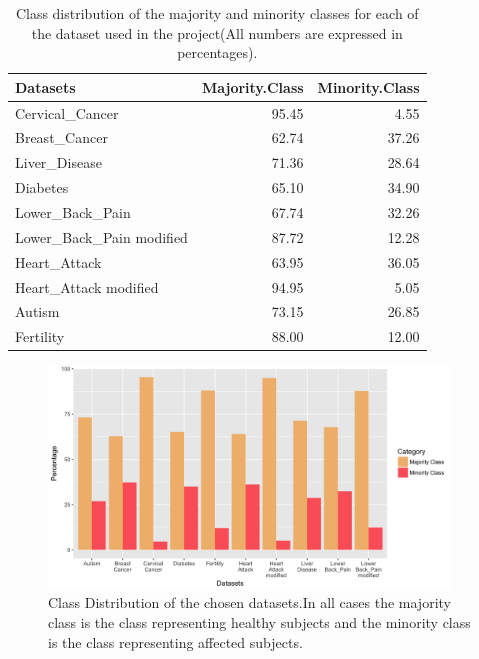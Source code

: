 \begin{table}[!htbp]
\centering
\begin{tabular}{lrr}
  \hline
  \rowcolor{LightCyan}
Datasets & Majority.Class & Minority.Class \\ 
  \hline
Cervical\_Cancer & 95.45 & 4.55 \\ 
  Breast\_Cancer & 62.74 & 37.26 \\ 
  Liver\_Disease & 71.36 & 28.64 \\ 
  Diabetes & 65.10 & 34.90 \\ 
  Lower\_Back\_Pain & 67.74 & 32.26 \\ 
  Lower\_Back\_Pain modified & 87.72 & 12.28 \\ 
  Heart\_Attack & 63.95 & 36.05 \\ 
  Heart\_Attack modified & 94.95 & 5.05 \\ 
  Autism & 73.15 & 26.85 \\ 
  Fertility & 88.00 & 12.00 \\ 
   \hline
\end{tabular}
\caption{Class distribution of the majority and minority classes for each of the dataset used in the project(All numbers are expressed in percentages).}
\label{tab:classDist}
\end{table}

\begin{figure}[!htbp]
    \centering
    \includegraphics[width=0.95\textwidth]{ThesisTemplate/usingLatex/chapter4Images/figure4_1b.png}
    \caption{Class Distribution of the chosen datasets.\newline In all cases the majority class is the class representing healthy subjects and the minority class is the class representing affected subjects.}
    \label{fig:classDistr}
\end{figure}




